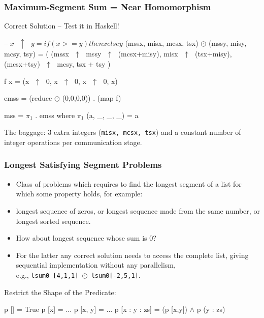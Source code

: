 \documentclass{beamer}
\renewcommand{\emph}[1]{\textcolor{structure}{#1}}
\newcommand{\emp}[1]{\textcolor{DikuRed}{ #1}}
\newcommand{\mymath}[1]{$ #1 $}
\newcommand{\myindx}[1]{_{#1}}
\begin{document}
\begin{frame}[fragile,t]
  \frametitle{Maximum-Segment Sum = Near Homomorphism}

\begin{block}{Correct Solution -- Test it in Haskell!}
\begin{colorcode}
-- \mymath{x\mbox{ }\uparrow\mbox{ }y = if(x >= y) then x else y}
(mssx, misx, mcsx, tsx) \mymath{\odot} (mssy, misy, mcsy, tsy) = (
        (mssx\mymath{\mbox{ }\uparrow\mbox{ }}mssy\mymath{\mbox{ }\uparrow\mbox{ }}(mcsx+misy),
         misx\mymath{\mbox{ }\uparrow\mbox{ }}(tsx+misy),
        (mcsx+tsy)\mymath{\mbox{ }\uparrow\mbox{ }}mcsy,
         tsx + tsy
    )

f x = (x\mymath{\mbox{ }\uparrow\mbox{ }}0, x\mymath{\mbox{ }\uparrow\mbox{ }}0, x\mymath{\mbox{ }\uparrow\mbox{ }}0, x)

\emph{emss = (reduce \mymath{\odot} (0,0,0,0)) . (map f)}

\emp{mss  = \mymath{\pi\myindx{1}} . emss}
       where \mymath{\pi\myindx{1}} (a, _, _, _) = a 
\end{colorcode}
\end{block} 

\smallskip

The baggage: $3$ extra integers ({\tt misx, mcsx, tsx}) 
and a constant number of integer operations per communication stage. 


\end{frame}


\begin{frame}[fragile,t]
  \frametitle{Longest Satisfying Segment Problems}

\begin{itemize}
    \item Class of problems which requires to find the longest segment of a list
            for which some property holds, for example:
    \item longest sequence of zeros, or longest sequence made from the same number, or longest sorted sequence.  
    \item How about longest sequence whose sum is 0?
    \item For the latter any correct solution needs to access the complete list, giving 
            sequential implementation without any parallelism, \\ e.g., {\tt lsum0 [4,1,1] $\odot$ lsum0[-2,5,1]}.
\end{itemize}

\bigskip

\begin{block}{Restrict the Shape of the Predicate:}
\begin{colorcode}
p []           = True
p [x]          = ...
p [x, y]       = ...
p [x : y : zs] = (p [x,y]) \mymath{\wedge} p (y : zs)
\end{colorcode}
\end{block} 

\end{frame}
\end{document}
